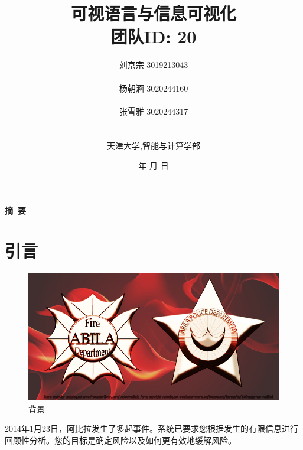 \documentclass[a4paper]{article}
\begin{document}
\renewcommand{\contentsname}{目\ 录}
\renewcommand{\appendixname}{附录}
\renewcommand{\appendixpagename}{附录}
\renewcommand{\refname}{参考文献}

\renewcommand{\tablename}{表}
\renewcommand{\today}{\number\year 年 \number\month 月 \number\day 日}

\title{{\Huge 可视语言与信息可视化{\large\linebreak\\}}{\Large 团队ID: 20\linebreak}
{\Large  \linebreak\linebreak}}
\author{ \large
  刘京宗 3019213043
  \\\\
  杨朝涵 3020244160
  \\\\
  张雪雅 3020244317
  \\\\\\
  天津大学,智能与计算学部}
\date{\today}
\maketitle
\newpage

\begin{center}
  \tableofcontents\label{c}
\end{center}
\newpage


\begin{center}
  {\Large\bf{摘\ 要\\}}




\end{center}

\newpage



\section{引言}
\label{overview}
\begin{figure}[htbp]
  \centering
  \includegraphics[width=1\textwidth]{images/MC3.jpg}
  \caption{背景}\label{fig:MC3}
  \vspace{\baselineskip}
\end{figure}
2014年1月23日，阿比拉发生了多起事件。系统已要求您根据发生的有限信息进行回顾性分析。您的目标是确定风险以及如何更有效地缓解风险。
\end{document}
